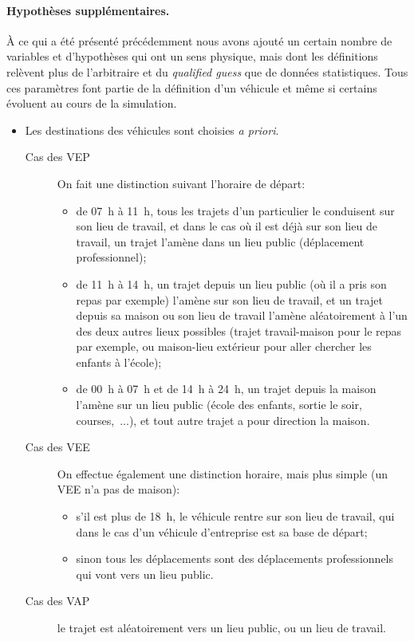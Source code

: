 		\paragraph{Hypothèses supplémentaires.} À ce qui a été présenté précédemment nous avons ajouté un certain nombre de variables et d'hypothèses qui ont un sens physique, mais dont les définitions relèvent plus de l'arbitraire et du \emph{qualified guess} que de données statistiques. Tous ces paramètres font partie de la définition d'un véhicule et même si certains évoluent au cours de la simulation.
		\begin{itemize}
			\item Les destinations des véhicules sont choisies \emph{a priori}. 
				\begin{description}
					\item[Cas des VEP] On fait une distinction suivant l'horaire de départ:
					\begin{itemize}
    						\item de 07~h à 11~h, tous les trajets d'un particulier le conduisent sur son lieu de travail, et dans le cas où il est déjà sur son lieu de travail, un trajet l'amène dans un lieu public (déplacement professionnel);
    						\item de 11~h à 14~h, un trajet depuis un lieu public (où il a pris son repas par exemple) l'amène sur son lieu de travail, et un trajet depuis sa maison ou son lieu de travail l'amène aléatoirement à l'un des deux autres lieux possibles (trajet travail-maison pour le repas par exemple, ou maison-lieu extérieur pour aller chercher les enfants à l'école);
    						\item de 00~h à 07~h et de 14~h à 24~h, un trajet depuis la maison l'amène sur un lieu public (école des enfants, sortie le soir, courses,~...), et tout autre trajet a pour direction la maison.
    					\end{itemize}
					\item[Cas des VEE] On effectue également une distinction horaire, mais plus simple (un VEE n'a pas de \og{}maison\fg{}):
    					\begin{itemize}
    						\item s'il est plus de 18~h, le véhicule rentre sur son lieu de travail, qui dans le cas d'un véhicule d'entreprise est sa base de départ;
    						\item sinon tous les déplacements sont des déplacements professionnels qui vont vers un lieu public.
    					\end{itemize}
					\item[Cas des VAP] le trajet est aléatoirement vers un lieu public, ou un lieu de travail.

\end{description}
\end{itemize}
